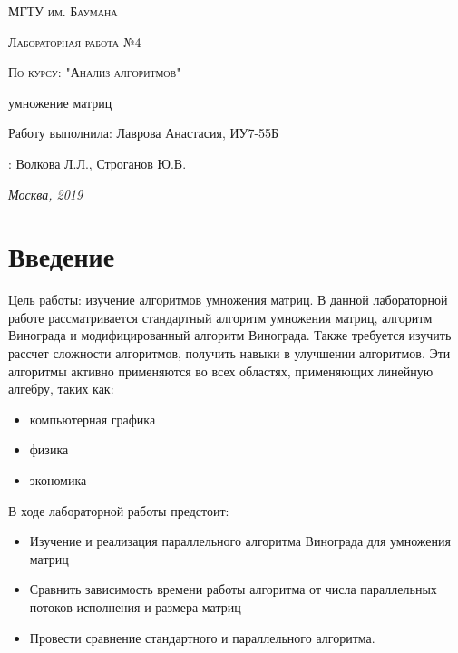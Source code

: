 \documentclass[12pt]{report}
\begin{document}
\begin{titlepage}
	\centering
	{\scshape\LARGE МГТУ им. Баумана \par}
	\vspace{3cm}
	{\scshape\Large Лабораторная работа №4\par}
	\vspace{0.5cm}	
	{\scshape\Large По курсу: "Анализ алгоритмов"\par}
	\vspace{1.5cm}
	{\huge{} умножение матриц\par}
	\vspace{2cm}
	\Large Работу выполнила: Лаврова Анастасия, ИУ7-55Б\par
	\vspace{0.5cm}
	:  Волкова Л.Л., Строганов Ю.В.\par

	\vfill
	\large \textit {Москва, 2019} \par
\end{titlepage}

\tableofcontents

\newpage
\chapter*{Введение}
Цель работы: изучение алгоритмов умножения матриц. В данной лабораторной работе рассматривается стандартный алгоритм умножения матриц, алгоритм Винограда и модифицированный алгоритм Винограда.  Также требуется изучить рассчет сложности алгоритмов, получить навыки в улучшении алгоритмов.
Эти алгоритмы активно применяются во всех областях, применяющих линейную алгебру, таких как:
\begin{itemize}
	\item компьютерная графика
	\item физика
	\item экономика
\end{itemize}


В ходе лабораторной работы предстоит:
\begin{itemize}
	\item  Изучение и реализация параллельного алгоритма Винограда для умножения матриц 
	\item Сравнить зависимость времени работы алгоритма от числа параллельных потоков исполнения и размера матриц 
	\item Провести сравнение стандартного и параллельного алгоритма.
\end{itemize}
\end{document}

